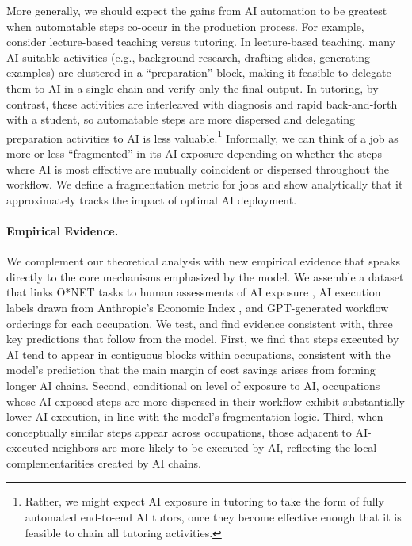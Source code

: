More generally, we should expect the gains from AI automation to be greatest when automatable steps co-occur in the production process.
For example, consider lecture-based teaching versus tutoring.
In lecture-based teaching, many AI-suitable activities (e.g., background research, drafting slides, generating examples) are clustered in a ``preparation'' block, making it feasible to delegate them to AI in a single chain and verify only the final output.
In tutoring, by contrast, these activities are interleaved with diagnosis and rapid back-and-forth with a student, so automatable steps are more dispersed and delegating preparation activities to AI is less valuable.\footnote{Rather, we might expect AI exposure in tutoring to take the form of fully automated end-to-end AI tutors, once they become effective enough that it is feasible to chain all tutoring activities.} 
Informally, we can think of a job as more or less ``fragmented'' in its AI exposure depending on whether the steps where AI is most effective are mutually coincident or dispersed throughout the workflow.
We define a fragmentation metric for jobs and show analytically that it approximately tracks the impact of optimal AI deployment.



\paragraph{Empirical Evidence.}
We complement our theoretical analysis with new empirical evidence that speaks directly to the core mechanisms emphasized by the model.
We assemble a dataset that links O*NET tasks to human assessments of AI exposure \citep{eloundou2023gpts}, AI execution labels drawn from Anthropic's Economic Index \citep{handa2025economictasksperformedai}, and GPT-generated workflow orderings for each occupation.
We test, and find evidence consistent with, three key predictions that follow from the model.
First, we find that steps executed by AI tend to appear in contiguous blocks within occupations, consistent with the model's prediction that the main margin of cost savings arises from forming longer AI chains.
Second, conditional on level of exposure to AI, occupations whose AI-exposed steps are more dispersed in their workflow exhibit substantially lower AI execution, in line with the model's fragmentation logic.
Third, when conceptually similar steps appear across occupations, those adjacent to AI-executed neighbors are more likely to be executed by AI, reflecting the local complementarities created by AI chains.